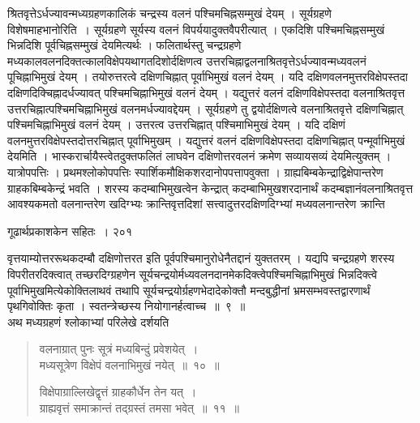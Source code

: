 \documentclass[11pt, openany]{book}
\begin{document}
\noindent श्रितवृत्तेऽर्धज्यावन्मध्यग्रहणकालिकं चन्द्रस्य वलनं पश्चिमचिह्नसम्मुखं देयम् । सूर्यग्रहणे विशेषमाह\textendash भानोरिति~। सूर्यग्रहणे सूर्यस्य वलनं विपर्ययादुक्तवैपरीत्यात् । एकदिशि पश्चिमचिह्नसम्मुखं भिन्नदिशि पूर्वचिह्नसम्मुखं देयमित्यर्थः । फलितार्थस्तु चन्द्रग्रहणे मध्यकालवलनदिक्तत्कालविक्षेपयथागतदिशोर्दक्षिणत्व उत्तरचिह्नाद्वलनाश्रितवृत्तेऽर्धज्यावन्मध्यवलनं पूचिह्नाभिमुखं देयम् । तयोरुत्तरत्वे दक्षिणचिह्नात् पूर्वाभिमुखं वलनं देयम् । यदि दक्षिणवलनमुत्तरविक्षेपस्तदा दक्षिणदिक्चिह्नादर्धज्यावत् पश्चिमचिह्नाभिमुखं वलनं देयम् । यद्युत्तरं वलनं दक्षिणविक्षेपस्तदा वलनाश्रितवृत्त उत्तरचिह्नात्पश्चिमचिह्नाभिमुखं वलनमर्धज्यावद्देयम् । सूर्यग्रहणे तु द्वयोर्दक्षिणत्वे वलनाश्रितवृत्ते दक्षिणचिह्नात् पश्चिमचिह्नाभिमुखं वलनं देयम् । उत्तरत्व उत्तरचिह्नात् पश्चिमाभिमुखं देयम् । यदि दक्षिणं वलनमुत्तरविक्षेपस्तदोत्तरचिह्नात् पूर्वाभिमुखम् । यद्युत्तरं वलनं दक्षिणविक्षेपस्तदा दक्षिणचिह्नात् पन्मूर्वाभिमुखं देयमिति । भास्करार्चायैस्त्वेतदुक्तफलितं लाघवेन दक्षिणोत्तरवलनं क्रमेण सव्यायसव्यं देयमित्युक्तम् । यात्रोपपत्तिः । प्रथमश्लोकोपपत्तिः स्पार्शिकमौक्षिकशरदानोपपत्तापवुक्ता । ग्राह्यबिम्बकेन्द्राद्विक्षेपान्तरेण ग्राहकबिम्बकेन्द्रं भवति । शरस्य कदम्बाभिमुखत्वेन केन्द्रात् कदम्बाभिमुखशरदानार्थं कदम्बज्ञानंवलनाश्रितवृत्त आवश्यकमतो वलनान्तरेण खदिग्भ्यः क्रान्तिवृत्तदिशां सत्त्वादुत्तरदक्षिणदिग्भ्यां मध्यवलनान्तरेण क्रान्ति\textendash


\newpage

\hspace{3.5cm} गूढार्थप्रकाशकेन सहितः~। \hfill २०१
\vspace{1cm}


\noindent वृत्तयाम्योत्तररूथकदम्बौ दक्षिणोत्तरत इति पूर्वपश्चिमानुरोधेनैतद्दानं युक्ततरम् । यद्यपि चन्द्रग्रहणे शरस्य विपरीतरदिक्त्वात् तच्छरदिग्ग्रहणेन सूर्यचन्द्रयोर्मध्यवलनदानमेकदिक्त्वेपश्चिमचिह्नाभिमुखं भिन्नदिक्त्वे पूर्वाभिमुखमित्येकोक्तिलाथवं तथापि सूर्यचन्द्रयोर्ग्रहणभेदादेकोक्तौ मन्दबुद्धीनां भ्रमसम्भवस्तद्वारणार्थं पृथगिवोक्तिः कृता । स्वतन्त्रेच्छस्य नियोगानर्हत्वाच्च~॥~९~॥\\
\noindent अथ मध्यग्रहणं श्लोकाभ्यां परिलेखे दर्शयति\textendash

\begin{quote}
{\ssi वलनाग्रात् पुनः सूत्रं मध्यबिन्दुं प्रवेशयेत्~।\\
 मध्यसूत्रेण विक्षेपं वलनाभिमुखं नयेत्~॥~१०~॥ 

 विक्षेपाग्राल्लिखेद्वृत्तं ग्राहकौर्धेन तेन यत्~।\\
 ग्राह्यवृत्तं समाक्रान्तं तद्ग्रस्तं तमसा भवेत्~॥~११~॥ }
\end{quote}
\end{document}
